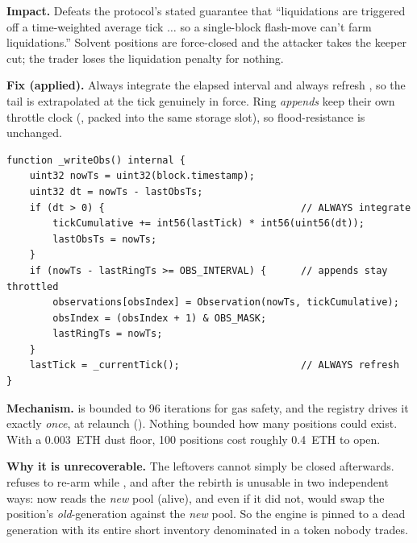 \textbf{Impact.} Defeats the protocol's stated guarantee that ``liquidations are
triggered off a time-weighted average tick $\ldots$ so a single-block flash-move
can't farm liquidations.'' Solvent positions are force-closed and the attacker
takes the keeper cut; the trader loses the liquidation penalty for nothing.

\textbf{Fix (applied).} Always integrate the elapsed interval and always refresh
, so the tail is extrapolated at the tick genuinely in force.
Ring \emph{appends} keep their own throttle clock (, packed into
the same storage slot), so flood-resistance is unchanged.

\begin{lstlisting}[numbers=none]
function _writeObs() internal {
    uint32 nowTs = uint32(block.timestamp);
    uint32 dt = nowTs - lastObsTs;
    if (dt > 0) {                                  // ALWAYS integrate
        tickCumulative += int56(lastTick) * int56(uint56(dt));
        lastObsTs = nowTs;
    }
    if (nowTs - lastRingTs >= OBS_INTERVAL) {      // appends stay throttled
        observations[obsIndex] = Observation(nowTs, tickCumulative);
        obsIndex = (obsIndex + 1) & OBS_MASK;
        lastRingTs = nowTs;
    }
    lastTick = _currentTick();                     // ALWAYS refresh
}
\end{lstlisting}



\textbf{Mechanism.}  is bounded to 96 iterations for gas
safety, and the registry drives it exactly \emph{once}, at relaunch
(). Nothing bounded how many positions could
exist. With a 0.003~ETH dust floor, 100 positions cost roughly 0.4~ETH to open.

\textbf{Why it is unrecoverable.} The leftovers cannot simply be closed
afterwards.  refuses to re-arm while ,
and after the rebirth  is unusable in two independent ways:
 now reads the \emph{new} pool (alive), and even if it did not,
 would swap the position's \emph{old}-generation 
against the \emph{new} pool. So the engine is pinned to a dead generation with
its entire short inventory denominated in a token nobody trades.

